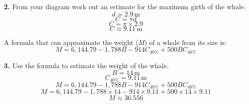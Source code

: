 \documentclass[fleqn]{article}
\newcommand{\unit}[1]{\ensuremath{\, \mathrm{#1}}}
\begin{document}
\textbf{2.} From your diagram work out an estimate for the maximum girth of the whale.
\begin{equation*}
  d = 2.9\unit{m}
\end{equation*}
\begin{equation*}
  C = \pi d
\end{equation*}
\begin{equation*}
  C = \pi \times 2.9
\end{equation*}
\begin{equation*}
  C \approx 9.11\unit{m}
\end{equation*}

A formula that can approximate the weight (\textit{M}) of a whale from its size is:
\begin{equation*}
  M = 6,144.79 - 1,788B - 914C_{40\%}+500BC_{40\%}
\end{equation*}

\textbf{3.} Use the formula to estimate the weight of the whale.
\begin{equation*}
  B = 14\unit{m}
\end{equation*}
\begin{equation*}
  C_{40\%} = 9.11\unit{m}
\end{equation*}
\begin{equation*}
  M = 6,144.79 - 1,788B - 914C_{40\%}+500BC_{40\%}
\end{equation*}
\begin{equation*}
  M = 6,144.79 - 1,788 \times 14 - 914 \times 9.11 + 500 \times 14 \times 9.11
\end{equation*}
\begin{equation*}
  M \approx 36.556
\end{equation*}
\end{document}
